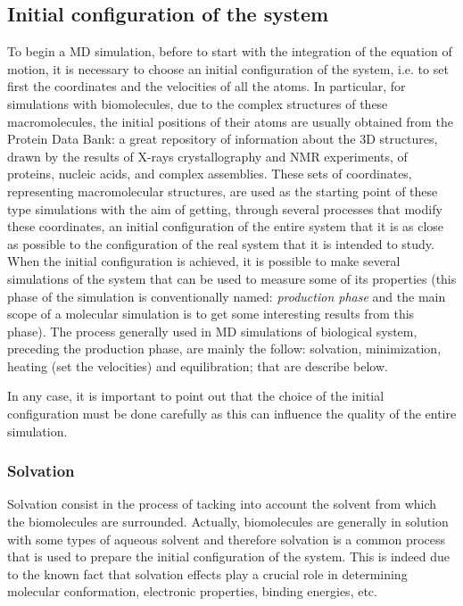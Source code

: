 \subsection{Initial configuration of the system}
To begin a MD simulation, before to start with the integration of the equation of motion, it is necessary to choose  an initial configuration of the system, i.e. to set first the coordinates and the velocities of all the atoms. In particular, for simulations with biomolecules, due to the complex structures of these macromolecules, the initial positions of their atoms are usually obtained from the Protein Data Bank: a great repository of information about the 3D structures, drawn by the results of X-rays crystallography and NMR experiments,
of proteins, nucleic acids, and complex assemblies.
These sets of coordinates, representing macromolecular structures, are used as the starting point of these type simulations with the aim of getting, through several processes that modify these coordinates, an initial configuration of the entire system that it is as close as possible to the configuration of the real system that it is intended to study. When the initial configuration is achieved, it is possible to make several simulations of the system that can be used to measure some of its properties (this phase of the simulation is conventionally named: \textit{production phase} and the main scope of a molecular simulation is to get some interesting results from this phase). The process generally used in MD simulations of biological system, preceding the production phase, are mainly the follow: solvation, minimization, heating (set the velocities) and equilibration; that are describe below.

In any case, it is important to point out that the choice of the initial configuration must be done carefully as this can influence the quality of the entire simulation.

\subsubsection{Solvation}
Solvation consist in the process of tacking into account the solvent from which the biomolecules are surrounded. Actually, biomolecules are generally in solution with some types of aqueous solvent and therefore solvation is a common process that is used to prepare the initial configuration of the system. This is indeed due to the known fact that solvation effects play a crucial role in determining molecular conformation, electronic properties, binding energies, etc.

